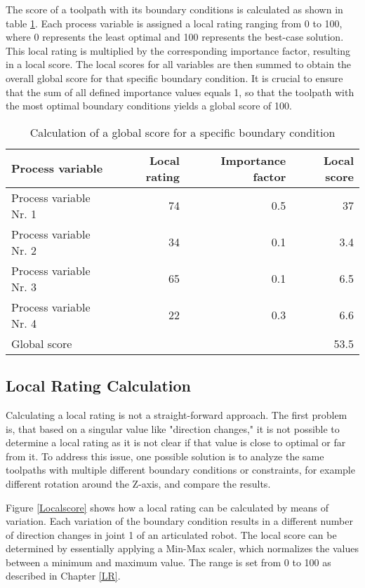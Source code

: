 \documentclass[conference]{IEEEtran}
\begin{document}
The score of a toolpath with its boundary conditions is calculated as shown in table \ref{weighting}. Each process variable is assigned a local rating ranging from 0 to 100, where 0 represents the least optimal and 100 represents the best-case solution. This local rating is multiplied by the corresponding importance factor, resulting in a local score. The local scores for all variables are then summed to obtain the overall global score for that specific boundary condition. It is crucial to ensure that the sum of all defined importance values equals 1, so that the toolpath with the most optimal boundary conditions yields a global score of 100.

\begin{table}[H]
	\centering
	\caption{Calculation of a global score for a specific boundary condition}
	\begin{tabular}{||l|r|r|r||}
		Process variable & Local rating & Importance factor& Local score\\
		\hline
		\hline
		\hline
		
		Process variable Nr. 1 & 74 & 0.5 & 37\\
		Process variable Nr. 2 & 34& 0.1&3.4\\
		Process variable Nr. 3 & 65& 0.1&6.5\\
		Process variable Nr. 4 & 22&0.3&6.6\\
		\hline
		\hline
		\hline
		Global score& & &53.5\\
		\hline
		\hline
	\end{tabular}
	
	
	\label{weighting}
\end{table}

\subsection{Local Rating Calculation}\label{LRC}
Calculating a local rating is not a straight-forward approach. The first problem is, that based on a singular value like "direction changes," it is not possible to determine a local rating as it is not clear if that value is close to optimal or far from it. To address this issue, one possible solution is to analyze the same toolpaths with multiple different boundary conditions or constraints, for example different rotation around the Z-axis, and compare the results.

Figure \ref{Localscore} shows how a local rating can be calculated by means of variation. Each variation of the boundary condition results in a different number of direction changes in joint 1 of an articulated robot. The local score can be determined by essentially applying a Min-Max scaler, which normalizes the values between a minimum and maximum value. The range is set from 0 to 100 as described in Chapter \ref{LR}.
\end{document}
